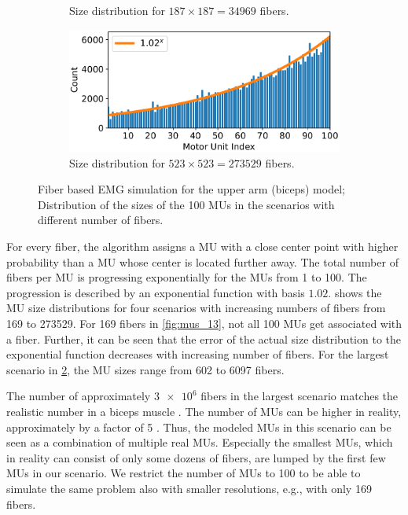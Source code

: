 \begin{figure}
\begin{subfigure}[t]{0.45\textwidth}
    \caption{Size distribution for $187\times 187 = \num{34969}$ fibers.}%
    \label{fig:mus_187}%
  \end{subfigure} 
  \begin{subfigure}[t]{0.45\textwidth}%
    \centering%
    \includegraphics[width=\textwidth]{images/results/application/MU_fibre_distribution_523x523_100mus_txt_fiber_distribution.pdf}%
    \caption{Size distribution for $523\times 523 = \num{273529}$ fibers.}%
    \label{fig:mus_523}%
  \end{subfigure}   
  \caption{Fiber based EMG simulation for the upper arm (biceps) model; Distribution of the sizes of the 100 MUs in the scenarios with different number of fibers.}%
  \label{fig:mu_sizes_100mus}%
\end{figure}%


For every fiber, the algorithm assigns a MU with a close center point with higher probability than a MU whose center is located further away. The total number of fibers per MU is progressing exponentially for the MUs from 1 to 100. The progression is described by an exponential function with basis $1.02$.  shows the MU size distributions for four scenarios with increasing numbers of fibers from \num{169} to \num{273529}. For 169 fibers in \cref{fig:mus_13}, not all 100 MUs get associated with a fiber. Further, it can be seen that the error of the actual size distribution to the exponential function decreases with increasing number of fibers. For the largest scenario in \cref{fig:mus_523}, the MU sizes range from 602 to 6097 fibers.

The number of approximately $\num{3e6}$ fibers in the largest scenario matches the realistic number in a biceps muscle \cite{MacDougall1984}. The number of MUs can be higher in reality, approximately by a factor of 5 \cite{Feinstein1955,MacIntosh2006}. Thus, the modeled MUs in this scenario can be seen as a combination of multiple real MUs. Especially the smallest MUs, which in reality can consist of only some dozens of fibers, are lumped by the first few MUs in our scenario. We restrict the number of MUs to 100 to be able to simulate the same problem also with smaller resolutions, e.g., with only 169 fibers.

